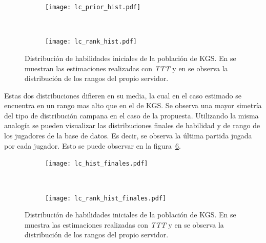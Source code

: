 \documentclass[11pt,twoside, spanish]{report} %
\begin{document}
\begin{figure}[H]
	\centering
	\begin{subfigure}[t]{.49\textwidth}
		\centering
		\texttt{[image: lc\_prior\_hist.pdf]}
		\caption{}
		\label{fig:hist_a}
	\end{subfigure}
	~
	\begin{subfigure}[t]{.49\textwidth}
		\centering
		\texttt{[image: lc\_rank\_hist.pdf]}
		\caption{}
		\label{fig:hist_b}
	\end{subfigure}
	\caption{Distribuci\'on de habilidades iniciales de la poblaci\'on de KGS. En  se muestran las estimaciones realizadas con \textit{TTT} y en   se observa la distribuci\'on de los rangos del propio servidor.}
	\label{fig:hist_rank}
\end{figure}

Estas dos distribuciones difieren en su media, la cual en el caso estimado se encuentra en un rango mas alto que en el de KGS.
Se observa una mayor simetr\'ia del tipo de distribuci\'on campana en el caso de la propuesta.
Utilizando la misma analog\'ia se pueden visualizar las distribuciones finales de habilidad y de rango de los jugadores de la base de datos.
Es decir, se observa la \'ultima partida jugada por cada jugador.
Esto se puede observar en la figura~\ref{fig:hist_rank_fin}.

\begin{figure}[H]
	\centering
	\begin{subfigure}[t]{.49\textwidth}
		\centering
		\texttt{[image: lc\_hist\_finales.pdf]}
		\caption{}
		\label{fig:hist_fin_a}
	\end{subfigure}
	~
	\begin{subfigure}[t]{.49\textwidth}
		\centering
		\texttt{[image: lc\_rank\_hist\_finales.pdf]}
		\caption{}
		\label{fig:hist_fin_b}
	\end{subfigure}
	\caption{Distribuci\'on de habilidades iniciales de la poblaci\'on de KGS. En  se muestra las estimaciones realizadas con \textit{TTT} y en  se observa la distribuci\'on de los rangos del propio servidor.}
	\label{fig:hist_rank_fin}
\end{figure}
\end{document}
